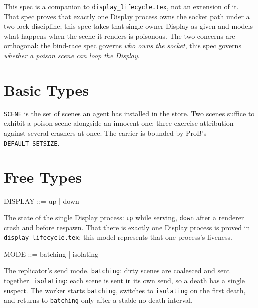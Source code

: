 \documentclass[a4paper,10pt,fleqn]{article}
\begin{document}
This spec is a companion to \texttt{display\_lifecycle.tex}, not an extension of
it.  That spec proves that exactly one Display process owns the socket path under
a two-lock discipline; this spec takes that single-owner Display as given and
models what happens when the scene it renders is poisonous.  The two concerns are
orthogonal: the bind-race spec governs \emph{who owns the socket}, this spec
governs \emph{whether a poison scene can loop the Display}.

\section{Basic Types}

\begin{zed}
  [SCENE]
\end{zed}

\texttt{SCENE} is the set of scenes an agent has installed in the store.  Two
scenes suffice to exhibit a poison scene alongside an innocent one; three
exercise attribution against several crashers at once.  The carrier is bounded by
ProB's \texttt{DEFAULT\_SETSIZE}.

\section{Free Types}

\begin{zed}
  DISPLAY ::= up | down
\end{zed}

The state of the single Display process: \texttt{up} while serving,
\texttt{down} after a renderer crash and before respawn.  That there is exactly
one Display process is proved in \texttt{display\_lifecycle.tex}; this model
represents that one process's liveness.

\begin{zed}
  MODE ::= batching | isolating
\end{zed}

The replicator's send mode.  \texttt{batching}: dirty scenes are coalesced and
sent together.  \texttt{isolating}: each scene is sent in its own send, so a
death has a single suspect.  The worker starts \texttt{batching}, switches to
\texttt{isolating} on the first death, and returns to \texttt{batching} only
after a stable no-death interval.
\end{document}
